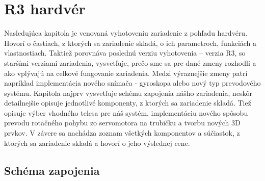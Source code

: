 \chapter{R3 hardvér}
\label{kap:2}
Nasledujúca kapitola je venovaná vyhotoveniu zariadenie z pohľadu hardvéru. Hovorí o častiach, z ktorých sa zariadenie skladá, o ich parametroch, funkciách a vlastnostiach. Taktiež porovnáva poslednú verziu vyhotovenia – verzia R3, so staršími verziami zariadenia, vysvetľuje, prečo sme sa pre dané zmeny rozhodli a ako vplývajú na celkové fungovanie zariadenia. Medzi výraznejšie zmeny patrí napríklad implementácia nového snímača - gyroskopa alebo nový typ prevodového systému. Kapitola najprv vysvetľuje schému zapojenia nášho zariadenia, neskôr detailnejšie opisuje jednotlivé komponenty, z ktorých sa zariadenie skladá. Tiež opisuje výber vhodného telesa pre náš systém, implementáciu nového spôsobu prevodu rotačného pohybu zo servomotora na trubičku a tvorbu nových 3D prvkov. V závere sa nachádza zoznam všetkých komponentov a súčiastok, z ktorých sa zariadenie skladá a hovorí o jeho výslednej cene. 

\section{Schéma zapojenia}
\label{kap:2.1}

